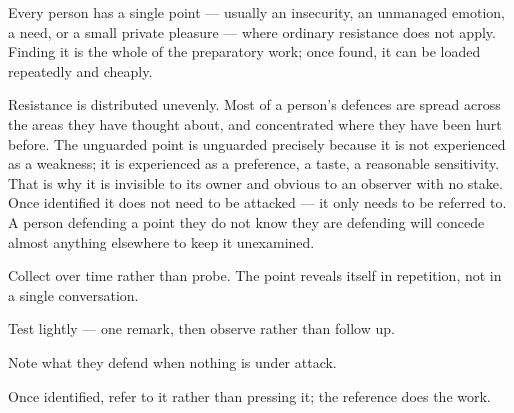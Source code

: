 


\begin{core}
Every person has a single point --- usually an insecurity, an unmanaged emotion, a need, or a small private pleasure --- where ordinary resistance does not apply. Finding it is the whole of the preparatory work; once found, it can be loaded repeatedly and cheaply.
\end{core}

\begin{mechanism}
Resistance is distributed unevenly. Most of a person's defences are spread across the areas they have thought about, and concentrated where they have been hurt before. The unguarded point is unguarded precisely because it is not experienced as a weakness; it is experienced as a preference, a taste, a reasonable sensitivity. That is why it is invisible to its owner and obvious to an observer with no stake. Once identified it does not need to be attacked --- it only needs to be referred to. A person defending a point they do not know they are defending will concede almost anything elsewhere to keep it unexamined.
\end{mechanism}

\begin{application}
  \item Collect over time rather than probe. The point reveals itself in repetition, not in a single conversation.
  \item Test lightly --- one remark, then observe rather than follow up.
  \item Note what they defend when nothing is under attack.
  \item Once identified, refer to it rather than pressing it; the reference does the work.
\end{application}

